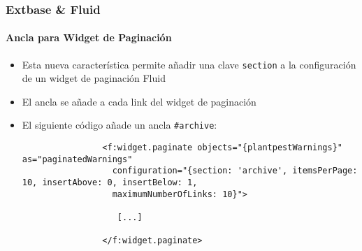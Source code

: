 \begin{frame}[fragile]
	\frametitle{Extbase \& Fluid}
	\framesubtitle{Ancla para Widget de Paginación}

	\lstset{basicstyle=\tiny\ttfamily}

	\begin{itemize}

		\item Esta nueva característica permite añadir una clave \texttt{section} a la configuración de un
			widget de paginación Fluid

		\item El ancla se añade a cada link del widget de paginación

		\item El siguiente código añade un ancla \texttt{\#archive}:

			\begin{lstlisting}
				<f:widget.paginate objects="{plantpestWarnings}" as="paginatedWarnings"
				  configuration="{section: 'archive', itemsPerPage: 10, insertAbove: 0, insertBelow: 1,
				  maximumNumberOfLinks: 10}">

				   [...]

				</f:widget.paginate>
			\end{lstlisting}

	\end{itemize}

\end{frame}


